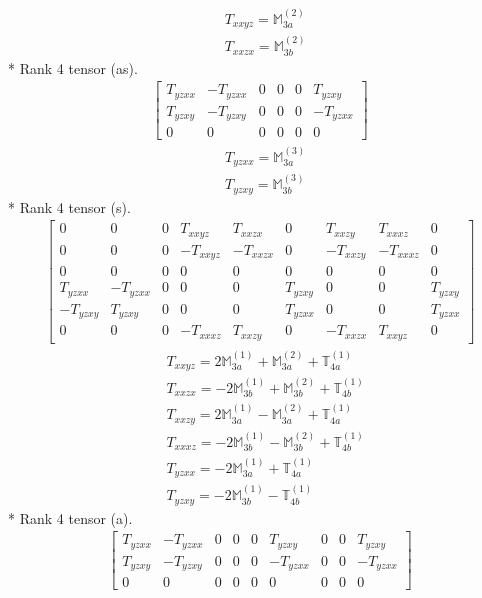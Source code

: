 \documentclass[fleqn,8pt,landscape]{jsarticle}
\begin{document}
\begin{align*}
& T_{xxyz} = \mathbb{M}_{3a}^{(2)} \\
& T_{xxzx} = \mathbb{M}_{3b}^{(2)}
\end{align*}
* Rank 4 tensor (as).
\begin{align*}
\begin{bmatrix} T_{yzxx} & - T_{yzxx} & 0 & 0 & 0 & T_{yzxy} \\ T_{yzxy} & - T_{yzxy} & 0 & 0 & 0 & - T_{yzxx} \\ 0 & 0 & 0 & 0 & 0 & 0 \end{bmatrix}
\end{align*}
\begin{align*}
& T_{yzxx} = \mathbb{M}_{3a}^{(3)} \\
& T_{yzxy} = \mathbb{M}_{3b}^{(3)}
\end{align*}
* Rank 4 tensor (s).
\begin{align*}
\begin{bmatrix} 0 & 0 & 0 & T_{xxyz} & T_{xxzx} & 0 & T_{xxzy} & T_{xxxz} & 0 \\ 0 & 0 & 0 & - T_{xxyz} & - T_{xxzx} & 0 & - T_{xxzy} & - T_{xxxz} & 0 \\ 0 & 0 & 0 & 0 & 0 & 0 & 0 & 0 & 0 \\ T_{yzxx} & - T_{yzxx} & 0 & 0 & 0 & T_{yzxy} & 0 & 0 & T_{yzxy} \\ - T_{yzxy} & T_{yzxy} & 0 & 0 & 0 & T_{yzxx} & 0 & 0 & T_{yzxx} \\ 0 & 0 & 0 & - T_{xxxz} & T_{xxzy} & 0 & - T_{xxzx} & T_{xxyz} & 0 \end{bmatrix}
\end{align*}
\begin{align*}
& T_{xxyz} = 2 \mathbb{M}_{3a}^{(1)} + \mathbb{M}_{3a}^{(2)} + \mathbb{T}_{4a}^{(1)} \\
& T_{xxzx} = - 2 \mathbb{M}_{3b}^{(1)} + \mathbb{M}_{3b}^{(2)} + \mathbb{T}_{4b}^{(1)} \\
& T_{xxzy} = 2 \mathbb{M}_{3a}^{(1)} - \mathbb{M}_{3a}^{(2)} + \mathbb{T}_{4a}^{(1)} \\
& T_{xxxz} = - 2 \mathbb{M}_{3b}^{(1)} - \mathbb{M}_{3b}^{(2)} + \mathbb{T}_{4b}^{(1)} \\
& T_{yzxx} = - 2 \mathbb{M}_{3a}^{(1)} + \mathbb{T}_{4a}^{(1)} \\
& T_{yzxy} = - 2 \mathbb{M}_{3b}^{(1)} - \mathbb{T}_{4b}^{(1)}
\end{align*}
* Rank 4 tensor (a).
\begin{align*}
\begin{bmatrix} T_{yzxx} & - T_{yzxx} & 0 & 0 & 0 & T_{yzxy} & 0 & 0 & T_{yzxy} \\ T_{yzxy} & - T_{yzxy} & 0 & 0 & 0 & - T_{yzxx} & 0 & 0 & - T_{yzxx} \\ 0 & 0 & 0 & 0 & 0 & 0 & 0 & 0 & 0 \end{bmatrix}
\end{align*}
\end{document}
